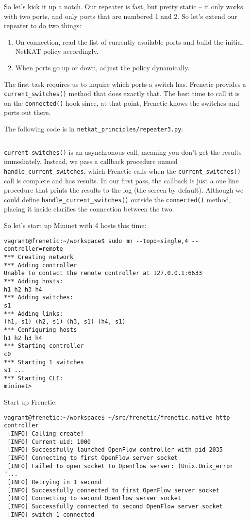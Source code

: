 So let's kick it up a notch.  
Our repeater is fast, but pretty static -- it only works with two ports, and only ports that are numbered
1 and 2.
So let's extend our repeater to do two things: 

\begin{enumerate}
\item On connection, read the list of currently available ports and build the initial NetKAT policy accordingly.
\item When ports go up or down, adjust the policy dynamically.
\end{enumerate}

The first task requires us to inquire which ports a switch has.  Frenetic provides a \texttt{current\_switches()}
method that does exactly that.   The best time to call it is on the \texttt{connected()} hook since, at that
point, Frenetic knows the switches and ports out there.

The following code is in \texttt{netkat\_principles/repeater3.py}:

\inputminted{python}{code/netkat_principles/repeater3.py}

\texttt{current\_switches()} is an asynchronous call, meaning you don't get the results immediately.
Instead, we pass a callback procedure named \texttt{handle\_current\_switches}, which Frenetic calls
when the \texttt{current\_switches()} call is complete and has results.  In our first pass, the callback
is just a one line procedure that prints the results to the log (the screen by default).  Although
we could define \texttt{handle\_current\_switches()} outside the \texttt{connected()} method, placing
it inside clarifies the connection between the two.  

So let's start up Mininet with 4 hosts this time:

\begin{verbatim}
vagrant@frenetic:~/workspace$ sudo mn --topo=single,4 --controller=remote
*** Creating network
*** Adding controller
Unable to contact the remote controller at 127.0.0.1:6633
*** Adding hosts:
h1 h2 h3 h4
*** Adding switches:
s1
*** Adding links:
(h1, s1) (h2, s1) (h3, s1) (h4, s1)
*** Configuring hosts
h1 h2 h3 h4
*** Starting controller
c0
*** Starting 1 switches
s1 ...
*** Starting CLI:
mininet>
\end{verbatim}

Start up Frenetic:

\begin{verbatim}
vagrant@frenetic:~/workspace$ ~/src/frenetic/frenetic.native http-controller
 [INFO] Calling create!
 [INFO] Current uid: 1000
 [INFO] Successfully launched OpenFlow controller with pid 2035
 [INFO] Connecting to first OpenFlow server socket
 [INFO] Failed to open socket to OpenFlow server: (Unix.Unix_error "...
 [INFO] Retrying in 1 second
 [INFO] Successfully connected to first OpenFlow server socket
 [INFO] Connecting to second OpenFlow server socket
 [INFO] Successfully connected to second OpenFlow server socket
 [INFO] switch 1 connected
\end{verbatim}

